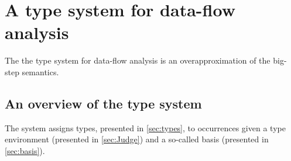 \documentclass[acmsmall,sigplan]{acmart}
\begin{document}
\iffalse
\begin{example}[Data-flow for abstractions]\label{ex:DFAbs}
The following program creates a local binding to the identity function and applies it twice.

\begin{lstlisting}[language=Caml, mathescape=true]
(let x ($\lambda$ y.(y$^1$))$^2$ (let z (x$^3$ 1$^4$)$^5$ (x$^6$ 2$^7$)$^{8}$)$^{9}$)$^{10}$
\end{lstlisting}
The transition tree can be found in \cref{FigEx.Abs}.
In the transition tree, we see that $\psi$ is extended a couple of times, where we will take a look at a couple of interesting extensions to $\psi$
The first time we evaluate the abstraction body, $\psi$ is on the following form:

$$\psi_2=(w_2=[x^{2}\mapsto(\emptyset,\emptyset), y^{4}\mapsto(\emptyset,\emptyset)],\sqsubseteq_w^2=\emptyset)$$
Here, the lookup of the parameter $y$ is simple, as there are only one occurrence, where we then know that $inf_{\psi_2}(y)=4$.

The second time we evaluate the body of the abstraction, $\psi$ is 
%
\[ \psi_3=(w_3=[x^{2}\mapsto(\emptyset,\emptyset),
  y^{4}\mapsto(\emptyset,\emptyset),
  y^{7}\mapsto(\emptyset,\emptyset)],\sqsubseteq_w^2=\{4,7\}) \]
Here, we now have two bindings for the parameter $y$, but since we also know that there are an ordering for the two occurrences of $y$, we then know that the program point $7$ is evaluated after $4$, as such we know that $inf_{\psi_3}(y)=7$.
\end{example}

\begin{landscape}

\end{landscape}
\fi

\section{A type system for data-flow analysis}\label{sec:TypeSys}

The the type system for data-flow analysis is an overapproximation of
the big-step semantics.

\subsection{An overview of the type system}

The system assigns types, presented in \cref{sec:types}, to
occurrences given a type environment (presented in
\cref{sec:Judge}) and a so-called basis (presented in
\cref{sec:basis}).
\end{document}
